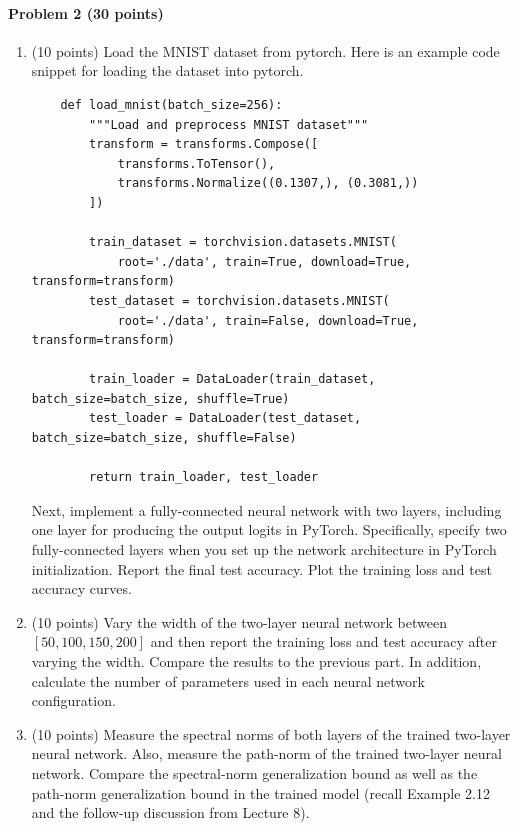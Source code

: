 \documentclass[11pt]{article}
\begin{document}
\paragraph{Problem 2 (30 points)}
\begin{enumerate}[label=(\alph*)]
    \item {(10 points)} Load the MNIST dataset from pytorch. Here is an example code snippet for loading the dataset into pytorch. 

    \begin{lstlisting}
    def load_mnist(batch_size=256):
        """Load and preprocess MNIST dataset"""
        transform = transforms.Compose([
            transforms.ToTensor(),
            transforms.Normalize((0.1307,), (0.3081,))
        ])
    
        train_dataset = torchvision.datasets.MNIST(
            root='./data', train=True, download=True, transform=transform)
        test_dataset = torchvision.datasets.MNIST(
            root='./data', train=False, download=True, transform=transform)
    
        train_loader = DataLoader(train_dataset, batch_size=batch_size, shuffle=True)
        test_loader = DataLoader(test_dataset, batch_size=batch_size, shuffle=False)
    
        return train_loader, test_loader
    \end{lstlisting}
    
    Next, implement a fully-connected neural network with two layers, including one layer for producing the output logits in PyTorch.
    Specifically, specify two fully-connected layers when you set up the network architecture in PyTorch initialization.
    Report the final test accuracy.
    Plot the training loss and test accuracy curves.
    
    \item {(10 points)}
    Vary the width of the two-layer neural network between $[50, 100, 150, 200]$ and then report the training loss and test accuracy after varying the width.
    Compare the results to the previous part.
    In addition, calculate the number of parameters used in each neural network configuration.

    \item {(10 points)}
    Measure the spectral norms of both layers of the trained two-layer neural network.
    Also, measure the path-norm of the trained two-layer neural network.
    Compare the spectral-norm generalization bound as well as the path-norm generalization bound in the trained model (recall Example 2.12 and the follow-up discussion from Lecture 8).
\end{enumerate}
\end{document}
